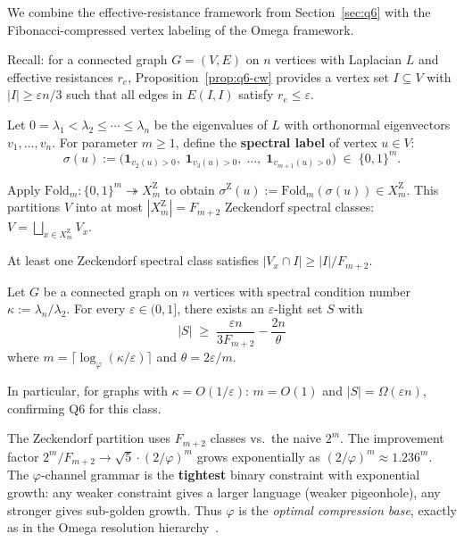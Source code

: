 We combine the effective-resistance framework from Section~\ref{sec:q6}
with the Fibonacci-compressed vertex labeling of the Omega framework.

Recall: for a connected graph $G=(V,E)$ on $n$ vertices with
Laplacian $L$ and effective resistances $r_e$,
Proposition~\ref{prop:q6-cw} provides a vertex set $I\subseteq V$
with $|I|\ge\varepsilon n/3$ such that all edges in $E(I,I)$ satisfy
$r_e\le\varepsilon$.

Let $0=\lambda_1<\lambda_2\le\cdots\le\lambda_n$ be the eigenvalues
of $L$ with orthonormal eigenvectors $v_1,\dots,v_n$.
For parameter $m\ge 1$, define the \textbf{spectral label}
of vertex $u\in V$:
\[
\sigma(u) := \bigl(\mathbf{1}_{v_2(u)>0},\;
\mathbf{1}_{v_3(u)>0},\;\dots,\;
\mathbf{1}_{v_{m+1}(u)>0}\bigr)
\;\in\; \{0,1\}^m.
\]

\begin{definition}
Apply $\mathrm{Fold}_m\colon\{0,1\}^m\twoheadrightarrow X_m^{\mathrm{Z}}$
to obtain $\sigma^{\mathrm{Z}}(u) := \mathrm{Fold}_m(\sigma(u))
\in X_m^{\mathrm{Z}}$.
This partitions $V$ into at most $|X_m^{\mathrm{Z}}|=F_{m+2}$
Zeckendorf spectral classes:
$V = \bigsqcup_{x\in X_m^{\mathrm{Z}}} V_x$.
\end{definition}

\begin{lemma}\label{lem:omega-q6-pigeonhole}
At least one Zeckendorf spectral class satisfies
$|V_x\cap I| \ge |I|/F_{m+2}$.
\end{lemma}

\begin{theorem}\label{thm:omega-q6-bounded-kappa}
Let $G$ be a connected graph on $n$ vertices with spectral condition
number $\kappa:=\lambda_n/\lambda_2$.
For every $\varepsilon\in(0,1]$, there exists an $\varepsilon$-light
set $S$ with
\[
|S| \;\ge\; \frac{\varepsilon n}{3F_{m+2}} - \frac{2n}{\theta}
\]
where $m=\lceil\log_\varphi(\kappa/\varepsilon)\rceil$
and $\theta=2\varepsilon/m$.

In particular, for graphs with $\kappa=O(1/\varepsilon)$:
$m=O(1)$ and $|S|=\Omega(\varepsilon n)$,
confirming Q6 for this class.
\end{theorem}

\begin{proposition}\label{prop:omega-q6-fibonacci}
The Zeckendorf partition uses $F_{m+2}$ classes vs.\ the naive
$2^m$.  The improvement factor $2^m/F_{m+2}\to\sqrt{5}\cdot(2/\varphi)^m$
grows exponentially as $(2/\varphi)^m\approx 1.236^m$.
The $\varphi$-channel grammar is the \textbf{tightest} binary
constraint with exponential growth: any weaker constraint gives
a larger language (weaker pigeonhole), any stronger gives sub-golden
growth.  Thus $\varphi$ is the \emph{optimal compression base},
exactly as in the Omega resolution hierarchy~\cite{omega-fop}.
\end{proposition}



